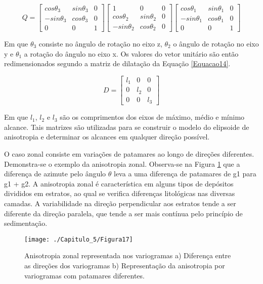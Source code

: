 \begin{equation}\label{Equacao13}
Q=\begin{bmatrix}
cos\theta_3 & sin\theta_3 & 0 \\
-sin\theta_3 & cos\theta_3 & 0\\
0 &0 & 1
\end{bmatrix}\begin{bmatrix}
1 & 0 & 0 \\
cos\theta_2 & sin\theta_2 & 0\\
-sin\theta_2 &cos\theta_2 & 0
\end{bmatrix}\begin{bmatrix}
cos\theta_1 & sin\theta_1 & 0 \\
-sin\theta_1 & cos\theta_1 & 0\\
0 &0 & 1
\end{bmatrix}
\end{equation}

Em que $\theta_3$ consiste no ângulo de rotação no eixo z, $\theta_2$ o ângulo de rotação no eixo y e $\theta_1$ a rotação do ângulo no eixo x.  Os valores do vetor unitário são então redimensionados segundo a matriz de dilatação da Equação \ref{Equacao14}.

\begin{equation}\label{Equacao14}
D=\begin{bmatrix}
l_1 & 0 & 0 \\
0 & l_2 & 0\\
0 &0 & l_3
\end{bmatrix}
\end{equation}

Em que $l_1$, $l_2$ e $l_3$ são os comprimentos dos eixos de máximo, médio e mínimo alcance. Tais matrizes são utilizadas para se construir o modelo do elipsoide de anisotropia e determinar os alcances em qualquer direção possível.

O caso zonal consiste em variações de patamares ao longo de direções diferentes. Demonstra-se o exemplo da anisotropia zonal. Observa-se na Figura \ref{Figura17} que a diferença de azimute pelo ângulo $\theta$ leva a uma diferença de patamares de g1 para g1 + g2. A anisotropia zonal é característica em alguns tipos de depósitos divididos em estratos, ao qual se verifica diferenças litológicas nas diversas camadas. A variabilidade na direção perpendicular aos estratos tende a ser diferente da direção paralela, que tende a ser mais contínua pelo princípio de sedimentação. 

\begin{figure}[H]
	\centering
	\texttt{[image: ./Capitulo\_5/Figura17]}
	\caption{Anisotropia zonal representada nos variogramas a) Diferença entre as direções dos variogramas b) Representação da anisotropia por variogramas com patamares diferentes.}
	\label{Figura17}
\end{figure}

